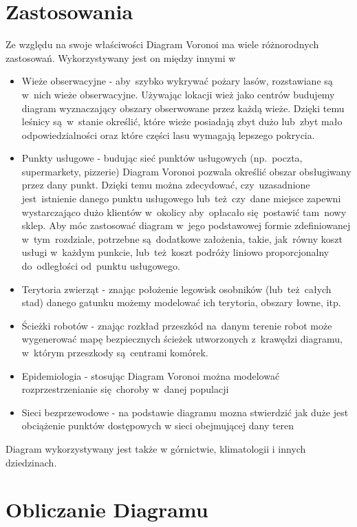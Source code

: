 \documentclass[skorowidz,autorrok,backref,xodstep,oswiadczenie]{wmimgr}
\begin{document}
\section{Zastosowania}

Ze względu na swoje właściwości Diagram Voronoi ma wiele różnorodnych zastosowań. Wykorzystywany jest on między innymi w
\begin{itemize}
\item
Wieże obserwacyjne - aby~szybko wykrywać pożary lasów, rozstawiane są w~nich wieże obserwacyjne. Używając lokacji wież jako centrów budujemy diagram wyznaczający obszary obserwowane przez każdą wieże. Dzięki temu leśnicy są~w~stanie określić, które wieże posiadają zbyt dużo lub~zbyt mało odpowiedzialności oraz które części lasu wymagają lepszego pokrycia.
\item
Punkty usługowe - budując sieć punktów usługowych (np.~poczta, supermarkety, pizzerie) Diagram Voronoi pozwala określić obszar obsługiwany przez dany punkt. Dzięki temu można zdecydować, czy~uzasadnione jest~istnienie danego punktu usługowego lub~też~czy~dane miejsce zapewni wystarczająco dużo klientów w~okolicy aby~opłacało się~postawić tam~nowy sklep. Aby móc zastosować diagram w~jego podstawowej formie zdefiniowanej w~tym~rozdziale, potrzebne są~dodatkowe założenia, takie, jak~równy koszt usługi w~każdym punkcie, lub~też~koszt podróży liniowo proporcjonalny do~odległości od~punktu usługowego.
\item
Terytoria zwierząt - znając położenie legowisk osobników (lub~też~całych stad) danego gatunku możemy modelować ich terytoria, obszary łowne, itp.
\item
Ścieżki robotów - znając rozkład przeszkód na~danym terenie robot może wygenerować mapę bezpiecznych ścieżek utworzonych z~krawędzi diagramu, w~którym przeszkody są~centrami komórek.
\item
Epidemiologia - stosując Diagram Voronoi można modelować rozprzestrzenianie się~choroby w~danej populacji
\item
Sieci bezprzewodowe - na podstawie diagramu mozna stwierdzić jak duże jest obciążenie punktów dostępowych w sieci obejmującej dany teren
\end{itemize}
Diagram wykorzystywany jest także w górnictwie, klimatologii i innych dziedzinach.

\section{Obliczanie Diagramu}
\end{document}
